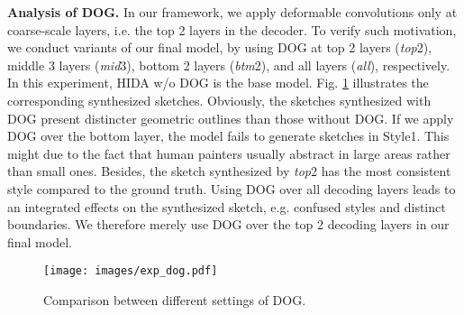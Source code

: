 \documentclass[10pt,twocolumn,letterpaper]{article}
\begin{document}
\textbf{Analysis of DOG.}
\label{ssec:exp_dfa}
In our framework, we apply deformable convolutions only at coarse-scale layers, i.e. the top 2 layers in the decoder. To verify such motivation, we conduct variants of our final model, by using DOG at top 2 layers (\textit{top}2), middle 3 layers (\textit{mid}3), bottom 2 layers (\textit{btm}2), and all layers (\textit{all}), respectively. %
In this experiment, HIDA w/o DOG is the base model. %
%
Fig. \ref{fig:exp_dfa} illustrates the corresponding synthesized sketches. Obviously, the sketches synthesized with DOG present distincter geometric outlines than those without DOG. 
If we apply DOG over the bottom layer, the model fails to generate sketches in Style1. 
This might due to the fact that human painters usually abstract in large areas rather than small ones. 
Besides, the sketch synthesized by \textit{top}2 has the most consistent style compared to the ground truth.
Using DOG over all decoding layers leads to an integrated effects on the synthesized sketch, e.g. confused styles and distinct boundaries. 
We therefore merely use DOG over the top 2 decoding layers in our final model. 

\begin{figure}
	\centering
	\texttt{[image: images/exp\_dog.pdf]}
	\caption{Comparison between different settings of DOG.}
	\label{fig:exp_dfa}
\end{figure}


\end{document}
